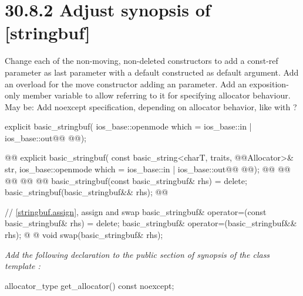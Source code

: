 \documentclass[ebook,11pt,article]{memoir}
\begin{document}
\section{30.8.2 Adjust synopsis of  [stringbuf]}
Change each of the non-moving, non-deleted constructors to add a const-ref  parameter as last parameter with a default constructed  as default argument. Add an overload for the move constructor adding an  parameter. Add an exposition-only member variable  to allow referring to it for specifying allocator behaviour. May be: Add noexcept specification, depending on allocator behavior, like with ?
\begin{codeblock}
    explicit basic_stringbuf(
        ios_base::openmode which = ios_base::in | ios_base::out@\added{,}@
        @@);

    @@
    explicit basic_stringbuf(
        const basic_string<charT, traits, @@Allocator>& str,
        ios_base::openmode which = ios_base::in | ios_base::out@\added{,}@
        @@);
    @@
    @@
        @@
        @@
        @@
    basic_stringbuf(const basic_stringbuf& rhs) = delete;
    basic_stringbuf(basic_stringbuf&& rhs);
    @@        

    // \ref{stringbuf.assign}, assign and swap
    basic_stringbuf& operator=(const basic_stringbuf& rhs) = delete;
    basic_stringbuf& operator=(basic_stringbuf&& rhs);
@%
@    void swap(basic_stringbuf& rhs);
\end{codeblock}


\textit{Add the following declaration to the public section of synopsis of the class template :}
\begin{addedblock}
\begin{codeblock}
    allocator_type get_allocator() const noexcept;
\end{codeblock}
\end{addedblock}
\end{document}
